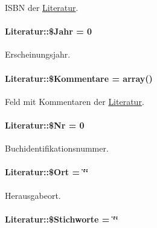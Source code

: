 ISBN der \hyperlink{classLiteratur}{Literatur}. 

\hypertarget{classLiteratur_2cb6f40a8757a0edd5da32385ad009c9}{
\paragraph[\$Jahr]{\setlength{\rightskip}{0pt plus 5cm}Literatur::\$Jahr = 0}\hfill}
\label{classLiteratur_2cb6f40a8757a0edd5da32385ad009c9}


Erscheinungsjahr. 

\hypertarget{classLiteratur_ebcaeb5c38ce2677a14189da511fa663}{
\paragraph[\$Kommentare]{\setlength{\rightskip}{0pt plus 5cm}Literatur::\$Kommentare = array()}\hfill}
\label{classLiteratur_ebcaeb5c38ce2677a14189da511fa663}


Feld mit Kommentaren der \hyperlink{classLiteratur}{Literatur}. 

\hypertarget{classLiteratur_036a682a93a5d50839c1ebc70a79d4b6}{
\paragraph[\$Nr]{\setlength{\rightskip}{0pt plus 5cm}Literatur::\$Nr = 0}\hfill}
\label{classLiteratur_036a682a93a5d50839c1ebc70a79d4b6}


Buchidentifikationsnummer. 

\hypertarget{classLiteratur_da6c458bb229187efea8e8f144a1d279}{
\paragraph[\$Ort]{\setlength{\rightskip}{0pt plus 5cm}Literatur::\$Ort = \char`\"{}\char`\"{}}\hfill}
\label{classLiteratur_da6c458bb229187efea8e8f144a1d279}


Herausgabeort. 

\hypertarget{classLiteratur_aa77f0f697d4bcf72279aadedd91ddff}{
\paragraph[\$Stichworte]{\setlength{\rightskip}{0pt plus 5cm}Literatur::\$Stichworte = \char`\"{}\char`\"{}}\hfill}
\label{classLiteratur_aa77f0f697d4bcf72279aadedd91ddff}


